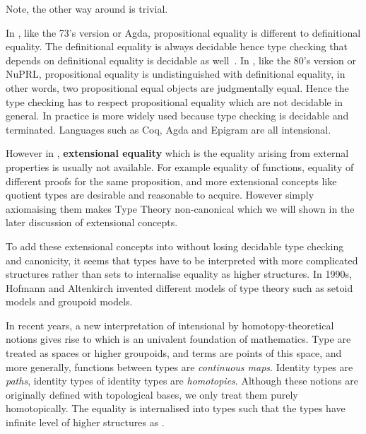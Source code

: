 Note, the other way around is trivial.

In \itt, like the 73's version or Agda, propositional equality is different to definitional equality. 
The definitional equality is always decidable hence type checking that depends on definitional equality is
decidable as well~\cite{alti:lics99}.
In \ett, like the 80's version \cite{martin1984intuitionistic} or NuPRL, propositional equality is undistinguished with definitional equality, in other words, two propositional equal objects are judgmentally equal. Hence the type checking has to respect propositional equality which are not decidable in general.
In practice \itt is more widely used because type checking is decidable and terminated. Languages such as Coq, Agda and Epigram are all intensional.

However in \itt, \textbf{extensional equality} which is the equality arising from external properties is usually not available. For example equality of functions, equality of different proofs for the same proposition, and more extensional concepts like quotient types are desirable and reasonable to acquire. However simply axiomaising them makes Type Theory non-canonical which we will shown in the later discussion of extensional concepts.


To add these extensional concepts into \itt without losing decidable type checking and canonicity, it seems that types have to be interpreted with more complicated structures rather than sets to internalise equality as higher structures.
In 1990s, Hofmann and Altenkirch invented different models of type theory such as setoid models and groupoid models.




In recent years, a new interpretation of intensional \mltt by homotopy-theoretical notions \cite{voe:06} gives rise to \hott which is an univalent foundation of mathematics. 
Type are treated as spaces or higher groupoids, and terms are points of this space, and more generally, functions between types are \emph{continuous maps}. Identity types are \emph{paths}, identity types of identity types are \emph{homotopies}. Although these notions are originally defined with topological bases, we only treat them purely homotopically. The equality is internalised into types such that the types have infinite level of higher structures as \wog.


